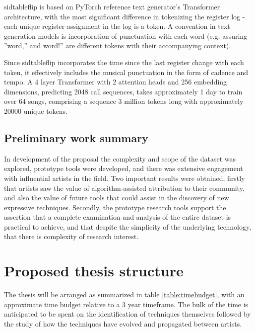 \documentclass[10pt]{article}
\begin{document}
\begin{multicols*}{2}
sidtableflip is based on PyTorch reference text generator’s Transformer architecture\cite{pytexample}, with the most significant difference in tokenizing the register log - each unique register assignment in the log is a token. A convention in text generation models is incorporation of punctuation with each word (e.g. assuring ”word,” and word!” are different tokens with their accompanying context).

Since sidtableflip incorporates the time since the last register change with each token, it effectively includes the musical punctuation in the form of cadence and tempo. A 4 layer Transformer with 2 attention heads and 256 embedding dimensions, predicting 2048 call sequences, takes approximately 1 day to train over 64 songs, comprising a sequence 3 million tokens long with approximately 20000 unique tokens.

\subsection{Preliminary work summary}

In development of the proposal the complexity and scope of the dataset was explored, prototype tools were developed, and there was extensive engagement with influential artists in the field. Two important results were obtained, firstly that artists saw the value of algorithm-assisted attribution to their community, and also the value of future tools that could assist in the discovery of new expressive techniques. Secondly, the prototype research tools support the assertion that a complete examination and analysis of the entire dataset is practical to achieve, and that despite the simplicity of the underlying technology, that there is complexity of research interest.

\section{Proposed thesis structure}

The thesis will be arranged as summarized in table \ref{table:timebudget}, with an approximate time budget relative to a 3 year timeframe. The bulk of the time is anticipated to be spent on the identification of techniques themselves followed by the study of how the techniques have evolved and propagated between artists.


\end{multicols*}
\end{document}
